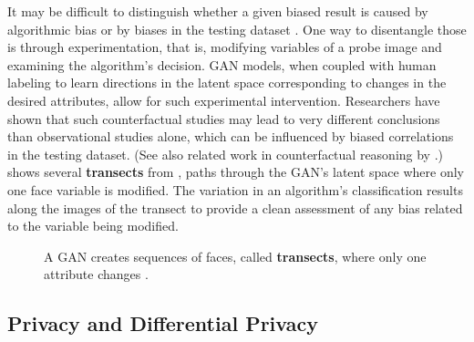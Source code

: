 It may be difficult to distinguish whether a given biased result is caused by algorithmic bias or by biases in the testing dataset \cite{Balakrishnan2020}.  One way to disentangle those is through experimentation, that is, modifying variables of a probe image and examining the algorithm's decision.  GAN models, when coupled with human labeling to learn directions in the latent space corresponding to changes in the desired attributes, allow for such experimental intervention. Researchers \cite{Balakrishnan2020} have shown that such counterfactual studies may lead to very different conclusions than observational studies alone, which can be influenced by biased correlations in the testing dataset.  (See also related work in counterfactual reasoning by \cite{Denton2019}.)  \Fig{\ref{fig:transect}} shows several {\bf transects} from \cite{Balakrishnan2020}, paths through the GAN's latent space where only one face variable is modified. The variation in an algorithm's classification results along the images of the transect to provide a clean assessment of any bias related to the variable being modified.

\begin{figure}[h!]
  \centerline{
    }
  \caption{
    A GAN creates sequences of faces, called {\bf transects}, where only one attribute changes \cite{Balakrishnan2020}.
  }
  \label{fig:transect}
\end{figure}



\subsection{Privacy and Differential Privacy}

